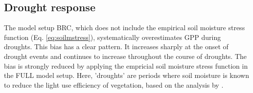 \documentclass{myreport}
\begin{document}




\subsection{Drought response}

The model setup BRC, which does not include the empirical soil moisture stress function (Eq. \ref{eq:soilmstress}), systematically overestimates GPP during droughts. This bias has a clear pattern. It increases sharply at the onset of drought events and continues to increase throughout the course of droughts. The bias is strongly reduced by applying the empricial soil moisture stress function in the FULL model setup. Here, 'droughts' are periods where soil moisture is known to reduce the light use efficiency of vegetation, based on the analysis by \cite{stocker18newphyt}.  
\end{document}
